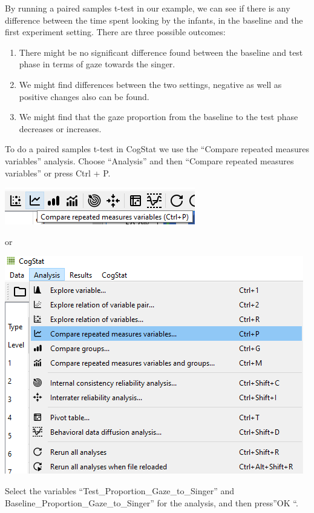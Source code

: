 \documentclass[
]{book}
\begin{document}
By running a paired samples t-test in our example, we can see if there is any difference between the time spent looking by the infants, in the baseline and the first experiment setting. There are three possible outcomes:

\begin{enumerate}
\def\labelenumi{\arabic{enumi}.}
\item
  There might be no significant difference found between the baseline and test phase in terms of gaze towards the singer.
\item
  We might find differences between the two settings, negative as well as positive changes also can be found.
\item
  We might find that the gaze proportion from the baseline to the test phase decreases or increases.
\end{enumerate}

To do a paired samples t-test in CogStat we use the ``Compare repeated measures variables'' analysis. Choose ``Analysis'' and then ``Compare repeated measures variables'' or press Ctrl + P.

\includegraphics{img/ch6/6.7comparerepeatedmeasures_icon.png}

or

\includegraphics{img/ch6/6.7comparerepeatedmeasures_menu.png}

Select the variables ``Test\_Proportion\_Gaze\_to\_Singer'' and Baseline\_Proportion\_Gaze\_to\_Singer'' for the analysis, and then press''OK ``.
\end{document}

